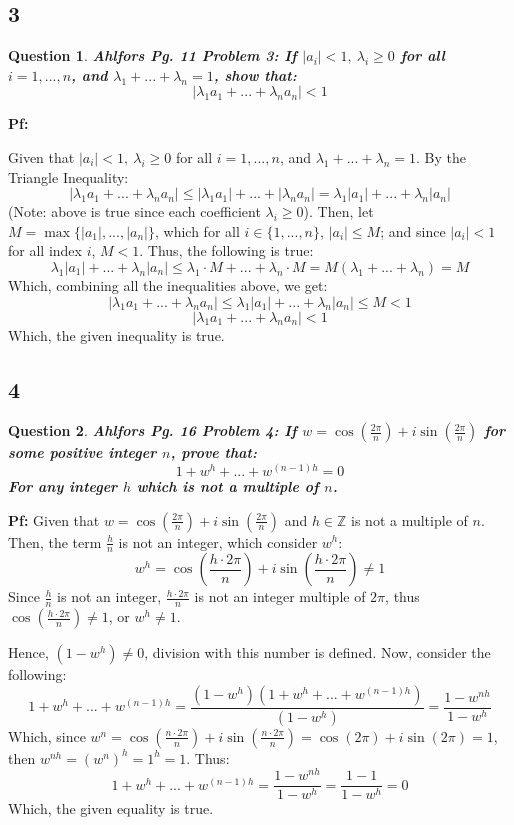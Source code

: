 \documentclass{article}
\newtheorem{question}{Question}
\begin{document}
\break

\subsection*{3}
\begin{question}
    \textbf{Ahlfors Pg. 11 Problem 3:
    If $|a_i|<1,\ \lambda_i \geq 0$ for all $i = 1,...,n$, and $\lambda_1 + ...+\lambda_n=1$, show that:
    $$|\lambda_1a_1 + ... + \lambda_na_n| <1$$
    }
\end{question}

\textbf{Pf:}

Given that $|a_i|<1,\ \lambda_i \geq 0$ for all $i = 1,...,n$, and $\lambda_1 + ...+\lambda_n=1$. By the Triangle Inequality:
$$|\lambda_1a_1 + ... + \lambda_na_n| \leq |\lambda_1a_1|+...+|\lambda_na_n| = \lambda_1|a_1|+...+\lambda_n|a_n|$$
(Note: above is true since each coefficient $\lambda_i \geq 0$).
Then, let $M = \max\{|a_1|,...,|a_n|\}$, which for all $i\in\{1,...,n\}$, $|a_i|\leq M$; and since $|a_i| <1$ for all index $i$, $M <1$.
Thus, the following is true:
$$\lambda_1|a_1|+...+\lambda_n|a_n| \leq \lambda_1\cdot M + ... +\lambda_n\cdot M = M(\lambda_1+...+\lambda_n) = M$$
Which, combining all the inequalities above, we get:
$$|\lambda_1a_1 + ... + \lambda_na_n| \leq \lambda_1|a_1|+...+\lambda_n|a_n| \leq M <1$$
$$|\lambda_1a_1 + ... + \lambda_na_n| <1$$
Which, the given inequality is true.

\break

\subsection*{4}
\begin{question}
    \textbf{Ahlfors Pg. 16 Problem 4:
    If $w = \cos(\frac{2\pi}{n})+i\sin(\frac{2\pi}{n})$ for some positive integer $n$, prove that:
    $$1+w^h+...+w^{(n-1)h}=0$$
    For any integer $h$ which is not a multiple of $n$.
    }
\end{question}

\textbf{Pf:}
Given that $w = \cos(\frac{2\pi}{n})+i\sin(\frac{2\pi}{n})$ and $h\in\mathbb{Z}$ is not a multiple of $n$. 
Then, the term $\frac{h}{n}$ is not an integer, which consider $w^h$:
$$w^h = \cos\left(\frac{h\cdot 2\pi}{n}\right)+i\sin\left(\frac{h\cdot 2\pi}{n}\right) \neq 1$$
Since $\frac{h}{n}$ is not an integer, $\frac{h\cdot 2\pi}{n}$ is not an integer multiple of $2\pi$, thus $\cos\left(\frac{h\cdot 2\pi}{n}\right)\neq 1$, or $w^h \neq 1$.

Hence, $(1-w^h) \neq 0$, division with this number is defined. Now, consider the following:
$$1+w^h+...+w^{(n-1)h} = \frac{(1-w^h)(1+w^h+...+w^{(n-1)h})}{(1-w^h)} = \frac{1-w^{nh}}{1-w^h}$$
Which, since $w^n = \cos(\frac{n\cdot 2\pi}{n})+i\sin(\frac{n\cdot 2\pi}{n}) = \cos(2\pi)+i\sin(2\pi) = 1$, then $w^{nh} = (w^n)^h = 1^h = 1$. Thus:
$$1+w^h+...+w^{(n-1)h} = \frac{1-w^{nh}}{1-w^h} = \frac{1-1}{1-w^h}=0$$
Which, the given equality is true.
\end{document}
